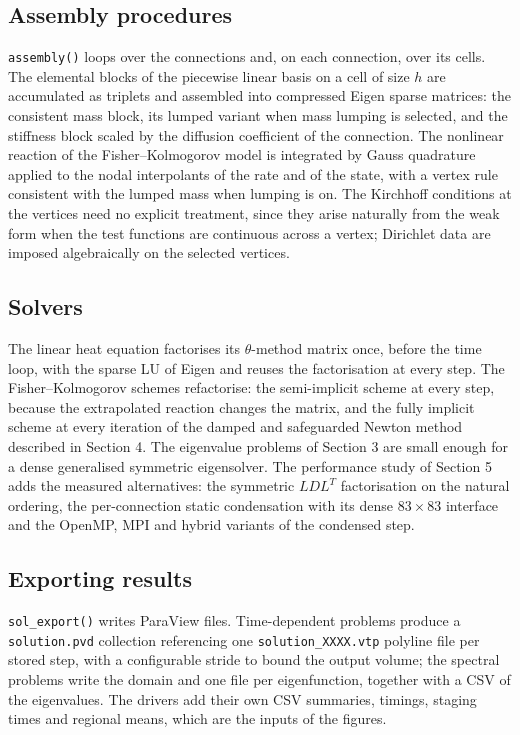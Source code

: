 \documentclass[11pt,a4paper]{article}
\begin{document}
\subsection{Assembly procedures}

\texttt{assembly()} loops over the connections and, on each connection,
over its cells. The elemental blocks of the piecewise linear basis on a
cell of size $h$ are accumulated as triplets and assembled into compressed
Eigen sparse matrices: the consistent mass block, its lumped variant when
mass lumping is selected, and the stiffness block scaled by the diffusion
coefficient of the connection. The nonlinear reaction of the
Fisher--Kolmogorov model is integrated by Gauss quadrature applied to the
nodal interpolants of the rate and of the state, with a vertex rule
consistent with the lumped mass when lumping is on. The Kirchhoff
conditions at the vertices need no explicit treatment, since they arise
naturally from the weak form when the test functions are continuous across
a vertex; Dirichlet data are imposed algebraically on the selected
vertices.

\subsection{Solvers}

The linear heat equation factorises its $\theta$-method matrix once, before
the time loop, with the sparse LU of Eigen and reuses the factorisation at
every step. The Fisher--Kolmogorov schemes refactorise: the semi-implicit
scheme at every step, because the extrapolated reaction changes the matrix,
and the fully implicit scheme at every iteration of the damped and
safeguarded Newton method described in Section 4. The eigenvalue problems
of Section 3 are small enough for a dense generalised symmetric
eigensolver. The performance study of Section 5 adds the measured
alternatives: the symmetric $LDL^{T}$ factorisation on the natural
ordering, the per-connection static condensation with its dense
$83\times 83$ interface and the OpenMP, MPI and hybrid variants of the
condensed step.

\subsection{Exporting results}

\texttt{sol\_export()} writes ParaView files. Time-dependent problems
produce a \texttt{solution.pvd} collection referencing one
\texttt{solution\_XXXX.vtp} polyline file per stored step, with a
configurable stride to bound the output volume; the spectral problems write
the domain and one file per eigenfunction, together with a CSV of the
eigenvalues. The drivers add their own CSV summaries, timings, staging
times and regional means, which are the inputs of the figures.
\end{document}
